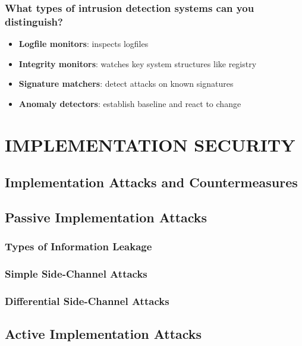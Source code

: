 \documentclass[a4paper, 10 pt, conference]{ieeeconf}
\begin{document}
\subsubsection{\textbf{What types of intrusion detection systems can you distinguish?}}
\begin{itemize}
\item \textbf{Logfile monitors}: inspects logfiles
\item \textbf{Integrity monitors}: watches key system structures like registry
\item \textbf{Signature matchers}: detect attacks on known signatures
\item \textbf{Anomaly detectors}: establish baseline and react to change
\end{itemize}




\pagebreak

\section{\textbf{IMPLEMENTATION SECURITY}}

\subsection{\textbf{Implementation Attacks and Countermeasures}}

\subsection{\textbf{Passive Implementation Attacks}}
\vspace{0.5cm}
\subsubsection{\textbf{Types of Information Leakage}}
\vspace{0.5cm}
\subsubsection{\textbf{Simple Side-Channel Attacks}}
\vspace{0.5cm}
\subsubsection{\textbf{Differential Side-Channel Attacks}}

\subsection{\textbf{Active Implementation Attacks}}
\vspace{0.5cm}
\end{document}
